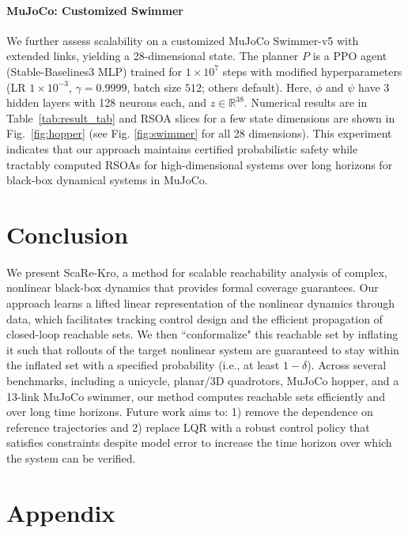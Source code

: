 \documentclass{l4dc2026}
\begin{document}
\paragraph{MuJoCo: Customized Swimmer}
We further assess scalability on a customized MuJoCo Swimmer-v5 \citep{todorov2012mujoco} with extended links, yielding a 28-dimensional state. The planner $P$ is a PPO agent (Stable-Baselines3 MLP) trained for $1\times10^{7}$ steps with modified hyperparameters (LR $1\times10^{-3}$, $\gamma=0.9999$, batch size $512$; others default). Here, $\phi$ and $\psi$ have 3 hidden layers with 128 neurons each, and $z \in \mathbb{R}^{38}$. Numerical results are in Table~\ref{tab:result_tab} and RSOA slices for a few state dimensions are shown in Fig.~\ref{fig:hopper} (see Fig. \ref{fig:swimmer} for all 28 dimensions). This experiment indicates that our approach maintains certified probabilistic safety while tractably computed RSOAs for high-dimensional systems over long horizons for black-box dynamical systems in MuJoCo.

\vspace{-16pt}
\section{Conclusion}
\label{conclusion}

We present ScaRe-Kro, a method for scalable reachability analysis of complex, nonlinear black-box dynamics that provides formal coverage guarantees. Our approach learns a lifted linear representation of the nonlinear dynamics through data, which facilitates tracking control design and the efficient propagation of closed-loop reachable sets. We then ``conformalize" this reachable set by inflating it such that rollouts of the target nonlinear system are guaranteed to stay within the inflated set with a specified probability (i.e., at least $1-\delta$). Across several benchmarks, including a unicycle, planar/3D quadrotors, MuJoCo hopper, and a 13-link MuJoCo swimmer, our method computes reachable sets efficiently and over long time horizons. Future work aims to: 1) remove the dependence on reference trajectories and 2) replace LQR with a robust control policy that satisfies constraints despite model error to increase the time horizon over which the system can be verified.


\newpage
\section{Appendix}
\label{Appendix}
\end{document}
